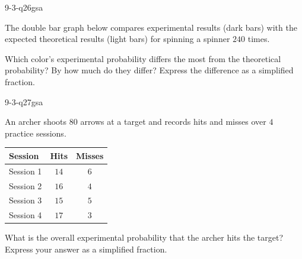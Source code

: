 \begin{practiceQuestion}{9-3-q26}{gsa}
\begin{questionText}
The double bar graph below compares experimental results (dark bars) with the expected theoretical results (light bars) for spinning a spinner $240$ times.

\begin{center}
\end{center}

Which color's experimental probability differs the most from the theoretical probability? By how much do they differ? Express the difference as a simplified fraction.
\end{questionText}
\end{practiceQuestion}

\begin{practiceQuestion}{9-3-q27}{gsa}
\begin{questionText}
An archer shoots $80$ arrows at a target and records hits and misses over $4$ practice sessions.

\begin{center}
\begin{tabular}{|l|c|c|}
\hline
\textbf{Session} & \textbf{Hits} & \textbf{Misses} \\
\hline
Session 1 & $14$ & $6$ \\
\hline
Session 2 & $16$ & $4$ \\
\hline
Session 3 & $15$ & $5$ \\
\hline
Session 4 & $17$ & $3$ \\
\hline
\end{tabular}
\end{center}

What is the overall experimental probability that the archer hits the target? Express your answer as a simplified fraction.
\end{questionText}
\end{practiceQuestion}

